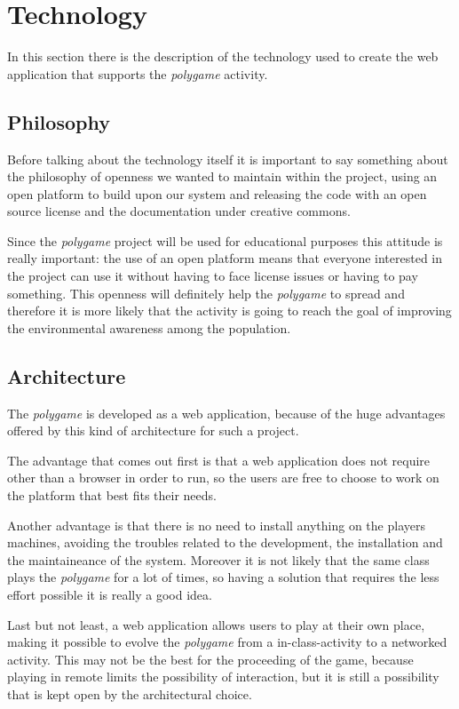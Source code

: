 \section{Technology}
In this section there is the description of the technology used to create the web application that supports the \emph{polygame} activity.

\subsection{Philosophy}
Before talking about the technology itself it is important to say something about the philosophy of openness we wanted to maintain within the project, using an open platform to build upon our system and releasing the code with an open source license and the documentation under creative commons.

Since the \emph{polygame} project will be used for educational purposes this attitude is really important: the use of an open platform means that everyone interested in the project can use it without having to face license issues or having to pay something. This openness will definitely help the \emph{polygame} to spread and therefore it is more likely that the activity is going to reach the goal of improving the environmental awareness among the population.

\subsection{Architecture}
The \emph{polygame} is developed as a web application, because of the huge advantages offered by this kind of architecture for such a project.

The advantage that comes out first is that a web application does not require other than a browser in order to run, so the users are free to choose to work on the platform that best fits their needs.

Another advantage is that there is no need to install anything on the players machines, avoiding the troubles related to the development, the installation and the maintaineance of the system.
Moreover it is not likely that the same class plays the \emph{polygame} for a lot of times, so having a solution that requires the less effort possible it is really a good idea.

Last but not least, a web application allows users to play at their own place, making it possible to evolve the \emph{polygame} from a in-class-activity to a networked activity. This may not be the best for the proceeding of the game, because playing in remote limits the possibility of interaction, but it is still a possibility that is kept open by the architectural choice.

